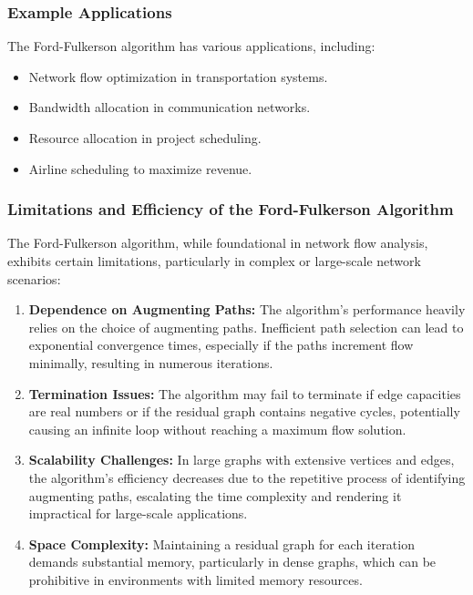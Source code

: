 \documentclass[12pt]{book} %
\begin{document}
\subsubsection{Example Applications}

The Ford-Fulkerson algorithm has various applications, including:

\begin{itemize}
    \item Network flow optimization in transportation systems.
    \item Bandwidth allocation in communication networks.
    \item Resource allocation in project scheduling.
    \item Airline scheduling to maximize revenue.
\end{itemize}

\subsubsection{Limitations and Efficiency of the Ford-Fulkerson Algorithm}

The Ford-Fulkerson algorithm, while foundational in network flow analysis, exhibits certain limitations, particularly in complex or large-scale network scenarios:

\begin{enumerate}
    \item \textbf{Dependence on Augmenting Paths:} The algorithm's performance heavily relies on the choice of augmenting paths. Inefficient path selection can lead to exponential convergence times, especially if the paths increment flow minimally, resulting in numerous iterations.
    
    \item \textbf{Termination Issues:} The algorithm may fail to terminate if edge capacities are real numbers or if the residual graph contains negative cycles, potentially causing an infinite loop without reaching a maximum flow solution.
    
    \item \textbf{Scalability Challenges:} In large graphs with extensive vertices and edges, the algorithm's efficiency decreases due to the repetitive process of identifying augmenting paths, escalating the time complexity and rendering it impractical for large-scale applications.
    
    \item \textbf{Space Complexity:} Maintaining a residual graph for each iteration demands substantial memory, particularly in dense graphs, which can be prohibitive in environments with limited memory resources.
\end{enumerate}
\end{document}
